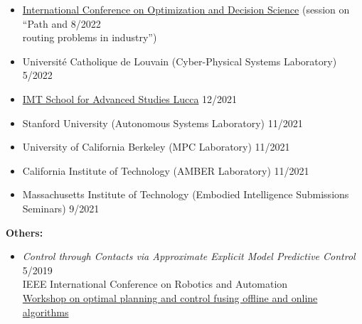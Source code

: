 \documentclass[11pt,a4paper,sans,twoside]{moderncv}
\begin{document}
\begin{itemize}
\item \href{http://www.airoconference.it/ods2022/}{\color{cyan}International Conference on Optimization and Decision Science} (session on ``Path and \hfill 8/2022 \\ routing problems in industry'') 


\item Universit\'e Catholique de Louvain (Cyber-Physical Systems Laboratory) \hfill 5/2022

\item \href{https://www.imtlucca.it/en/eventonew/shortest-paths-graphs-of-convex-sets}{\color{cyan}IMT School for Advanced Studies Lucca} \hfill 12/2021

\item Stanford University (Autonomous Systems Laboratory) \hfill 11/2021

\item University of California Berkeley (MPC Laboratory) \hfill 11/2021

\item California Institute of Technology (AMBER Laboratory) \hfill 11/2021

\item Massachusetts Institute of Technology (Embodied Intelligence Submissions Seminars) \hfill 9/2021


\end{itemize}

\textbf{Others:}

\begin{itemize}

\item \textit{Control through Contacts via Approximate Explicit Model Predictive Control} \hfill 5/2019 \\
IEEE International Conference on Robotics and Automation \\
\href{https://sites.google.com/mit.edu/icra19ws/speakers?authuser=0}{\color{cyan}Workshop  on optimal planning and control fusing offline and online algorithms}

\end{itemize}
\end{document}
